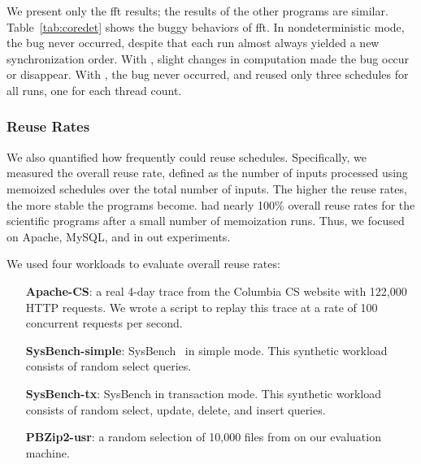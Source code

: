 We present only the fft results; the results of the other programs are
similar.  Table~\ref{tab:coredet} shows the buggy behaviors of fft.
  In nondeterministic mode, the bug never
occurred, despite that each run almost always yielded a new
synchronization order. With \coredet, slight changes in computation made the
bug occur or disappear.  With \tern, the bug never occurred, and
\tern reused only three schedules for all runs, one for each
thread count.  



\subsubsection{Reuse Rates} \label{sec:reuse-rate}

We also quantified how frequently \tern could reuse schedules.
Specifically, we measured the overall reuse rate, defined as the number of
inputs processed using memoized schedules over the total number of inputs.
The higher the reuse rates, the more stable the programs become.  \tern had
nearly 100\% overall reuse rates for the scientific programs after a small
number of memoization runs.  Thus, we focused on Apache, MySQL, and \pbzip
in out experiments.

We used four workloads to evaluate overall reuse rates:

\begin{enumerate}

\item[{\bf Apache-CS}:] a real 4-day trace from the Columbia CS website
  with 122,000 HTTP requests.  We wrote a script to replay this trace at a
  rate of 100 concurrent requests per second.

\item[{\bf SysBench-simple}:] SysBench~\cite{sysbench} in simple mode.  This
  synthetic workload consists of random select queries.


\item[{\bf SysBench-tx}:] SysBench in transaction mode.  This synthetic
  workload consists of random select, update, delete, and insert queries.

\item[{\bf PBZip2-usr}:] a random selection of 10,000 files from 
  on our evaluation machine.

\end{enumerate}

